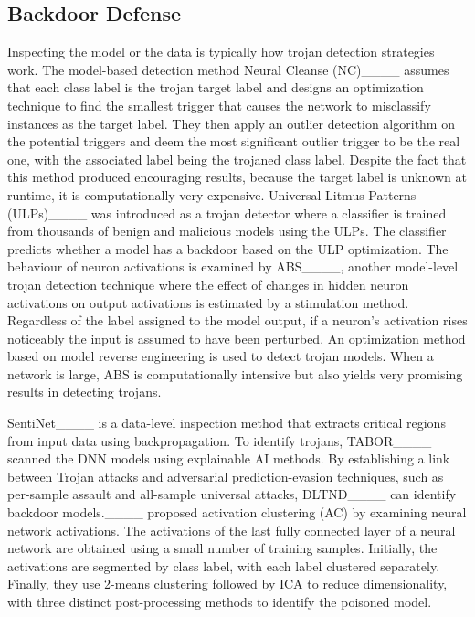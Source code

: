 \subsection{Backdoor Defense}
\label{sec:related-backdoor-defense}
    Inspecting the model or the data is typically how trojan detection strategies work. The model-based detection method Neural Cleanse (NC)____ assumes that each class label is the trojan target label and designs an optimization technique to find the smallest trigger that causes the network to misclassify instances as the target label. They then apply an outlier detection algorithm on the potential triggers and deem the most significant outlier trigger to be the real one, with the associated label being the trojaned class label. Despite the fact that this method produced encouraging results, because the target label is unknown at runtime, it is computationally very expensive. 
    Universal Litmus Patterns (ULPs)____ was introduced as a trojan detector where a classifier is trained from thousands of benign and malicious models using the ULPs. The classifier predicts whether a model has a backdoor based on the ULP optimization. The behaviour of neuron activations is examined by ABS____, another model-level trojan detection technique where the effect of changes in hidden neuron activations on output activations is estimated by a stimulation method. Regardless of the label assigned to the model output, if a neuron's activation rises noticeably the input is assumed to have been perturbed. An optimization method based on model reverse engineering is used to detect trojan models. When a network is large, ABS is computationally intensive but also yields very promising results in detecting trojans. 
    
    SentiNet____ is a data-level inspection method that extracts critical regions from input data using backpropagation. To identify trojans, TABOR____ scanned the DNN models using explainable AI methods. By establishing a link between Trojan attacks and adversarial prediction-evasion techniques, such as per-sample assault and all-sample universal attacks, DLTND____  can identify backdoor models.____ proposed activation clustering (AC) by examining neural network activations. The activations of the last fully connected layer of a neural network are obtained using a small number of training samples. Initially, the activations are segmented by class label, with each label clustered separately. Finally, they use 2-means clustering followed by ICA to reduce dimensionality, with three distinct post-processing methods to identify the poisoned model.

